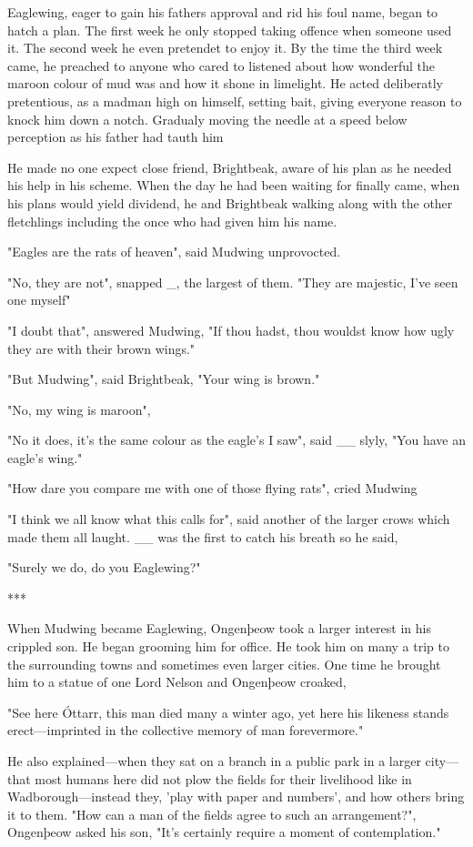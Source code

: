Eaglewing, eager to gain his fathers approval and rid his foul name, began to hatch a plan. The first week he only stopped taking offence when someone used it. The second week he even pretendet to enjoy it. By the time the third week came, he preached to anyone who cared to listened about how wonderful the maroon colour of mud was and how it shone in limelight. He acted deliberatly pretentious, as a madman high on himself, setting bait, giving everyone reason to knock him down a notch. Gradualy moving the needle at a speed below perception as his father had tauth him

He made no one expect close friend, Brightbeak, aware of his plan as he needed his help in his scheme. When the day he had been waiting for finally came, when his plans would yield dividend, he and Brightbeak walking along with the other fletchlings including the once who had given him his name.

"Eagles are the rats of heaven", said Mudwing unprovocted.

"No, they are not", snapped \_, the largest of them. "They are majestic, I've seen one myself"

"I doubt that", answered Mudwing, "If thou hadst, thou wouldst know how ugly they are with their brown wings."

"But Mudwing", said Brightbeak, "Your wing is brown."

"No, my wing is maroon", 

"No it does, it's the same colour as the eagle's I saw", said \_\_ slyly, "You have an eagle's wing."

"How dare you compare me with one of those flying rats", cried Mudwing

"I think we all know what this calls for", said another of the larger crows which made them all laught. \_\_ was the first to catch his breath so he said,  

"Surely we do, do you Eaglewing?"

***

When Mudwing became Eaglewing, Ongenþeow took a larger interest in his crippled son. He began grooming him for office. He took him on many a trip to the surrounding towns and sometimes even larger cities. One time he brought him to a statue of one Lord Nelson and Ongenþeow croaked, 

"See here Óttarr, this man died many a winter ago, yet here his likeness stands erect---imprinted in the collective memory of man forevermore."

He also explained---when they sat on a branch in a public park in a larger city---that most humans here did not plow the fields for their livelihood like in Wadborough---instead they, 'play with paper and numbers', and how others bring it to them. "How can a man of the fields agree to such an arrangement?", Ongenþeow asked his son, "It's certainly require a moment of contemplation."


